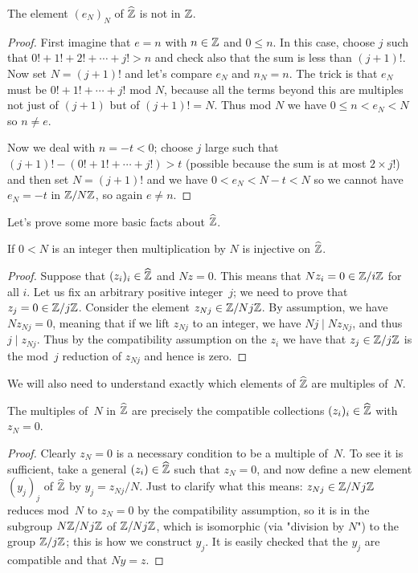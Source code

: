 \begin{lemma}
    \label{ZHat.e_not_in_Int}
    \leanok
    The element $(e_N)_N$ of $\widehat{\mathbb{Z}}$ is not in $\mathbb{Z}$.
\end{lemma}
\begin{proof}
    \leanok
    First imagine that $e=n$ with $n\in\mathbb{Z}$ and $0\leq n$. In this case, choose $j$
    such that $0!+1!+2!+\cdots+j!>n$ and check also that the sum is less
    than $(j+1)!$. Now set $N=(j+1)!$ and let's compare $e_N$
    and $n_N=n$. The trick is that $e_N$ must be $0!+1!+\cdots+j!$ mod $N$,
    because all the terms beyond this are multiples not just of $(j+1)$ but
    of $(j+1)!=N$. Thus mod $N$ we have $0\leq n<e_N<N$ so $n\not=e$.

    Now we deal with $n=-t<0$; choose $j$ large such that
    $(j+1)!-(0!+1!+\cdots+j!)>t$ (possible because the sum is at most $2\times j!$)
    and then set $N=(j+1)!$ and we have $0 < e_N<N-t<N$ so we cannot have $e_N=-t$ in $\mathbb{Z}/N\mathbb{Z}$,
    so again $e\not=n$.
\end{proof}

Let's prove some more basic facts about $\widehat{\mathbb{Z}}$.

\begin{lemma}
    \label{ZHat.torsionfree}
    \leanok
    If $0<N$ is an integer then multiplication by $N$ is injective on $\widehat{\mathbb{Z}}$.
\end{lemma}
\begin{proof}
    \leanok
    Suppose that $(z_i)_i\in\widehat{\mathbb{Z}}$ and $Nz=0$. This means that $Nz_i=0\in\mathbb{Z}/i\mathbb{Z}$ for all $i$.
    Let us fix an arbitrary positive integer~$j$; we need to prove that $z_j=0\in\mathbb{Z}/j\mathbb{Z}$.
    Consider the element $z_{Nj}\in\mathbb{Z}/Nj\mathbb{Z}$. By assumption, we have $Nz_{Nj}=0$, meaning that
    if we lift $z_{Nj}$ to an integer, we have $Nj\mid Nz_{Nj}$, and thus $j\mid z_{Nj}$.
    Thus by the compatibility assumption on the $z_i$ we have that $z_j\in\mathbb{Z}/j\mathbb{Z}$ is the
    mod~$j$ reduction of $z_{Nj}$ and hence is zero.
\end{proof}

We will also need to understand exactly which elements of $\widehat{\mathbb{Z}}$
are multiples of~$N$.

\begin{lemma}
    \label{ZHat.multiples}
    \leanok
    The multiples of~$N$ in $\widehat{\mathbb{Z}}$ are precisely the compatible collections $(z_i)_i\in\widehat{\mathbb{Z}}$
    with $z_N=0$.
\end{lemma}
\begin{proof} \leanok
    Clearly $z_N=0$ is a necessary condition to be a multiple of~$N$. To see it is sufficient,
    take a general $(z_i)\in\widehat{\mathbb{Z}}$ such that $z_N=0$,
    and now define a new element $(y_j)_j$ of $\widehat{\mathbb{Z}}$
    by $y_j=z_{Nj}/N$. Just to clarify what this means: $z_{Nj}\in\mathbb{Z}/Nj\mathbb{Z}$ reduces mod~$N$
    to $z_N=0$ by the compatibility assumption, so it is in the subgroup $N\mathbb{Z}/Nj\mathbb{Z}$ of $\mathbb{Z}/Nj\mathbb{Z}$,
    which is isomorphic (via "division by $N$") to the group $\mathbb{Z}/j\mathbb{Z}$; this is how we construct
    $y_j$. It is easily checked that the $y_j$ are compatible and that $Ny=z$.
\end{proof}

